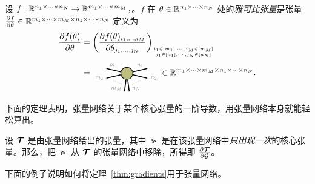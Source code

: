 \begin{definition}
 设 $f:\mathbb{R}^{n_1\times\dots\times n_N}\to\mathbb{R}^{m_1\times\dots\times m_M}$，。$f$ 在 $\theta\in\mathbb{R}^{n_1\times\dots\times n_N}$ 处的\emph{雅可比张量}是张量 $\frac{\partial f}{\partial\theta}\in\mathbb{R}^{m_1\times\dots\times m_M\times n_1\times\dots\times n_N}$
 定义为
\begin{align*}
   \frac{\partial f(\theta)}{\partial\theta} 
   &= 
   \left(\frac{\partial f(\theta)_{i_1,\dots,i_M}}{\partial\theta_{j_1,\dots,j_N}}\right)_{i_1\in[m_1],\cdots,i_M\in[m_M]\atop j_1\in[n_1],\cdots,j_N
\in[n_N]}\\
&=
\begin{tikzpicture}[baseline=-0.5ex]
    \tikzset{tensor/.style = {minimum size = 0.5cm,shape = circle,thick,draw=black,inner sep = 0pt}, edge/.style = {thick,line width=.4mm},every loop/.style={}}
    \def\x{6}
    \node[tensor,fill=green!50!red!50!white] (T) at (\x,0) {};
    \draw[edge] (T) -- (\x-0.85,0.2)node [midway, above]{\scalebox{0.7}{\dimcolor{$m_1$}}};
    \draw[edge] (T) -- (\x-0.85,-0.2)node [left]{\scalebox{0.7}{\dimcolor{$m_2$}}};
    \draw[edge] (T) -- (\x-0.1,-0.75)node [near end, left]{\scalebox{0.7}{\dimcolor{$m_M$}}};
    \draw[dotted] (\x-0.55,-0.3) -- (\x-0.2,-0.45);
    \draw[edge] (T) -- (\x+0.85,0.2)node [midway, above]{\scalebox{0.7}{\dimcolor{$n_1$}}};
    \draw[edge] (T) -- (\x+0.85,-0.2)node [right]{\scalebox{0.7}{\dimcolor{$n_2$}}};
    \draw[edge] (T) -- (\x+0.1,-0.75)node [near end, right]{\scalebox{0.7}{\dimcolor{$n_N$}}};
    \draw[dotted] (\x+0.55,-0.3) -- (\x+0.2,-0.45);
    \end{tikzpicture}\in\RR^{m_1\times\cdots\times m_M\times n_1\times\cdots\times n_N}. 
\end{align*}
\end{definition}




下面的定理表明，张量网络关于某个核心张量的一阶导数，用张量网络本身就能轻松算出。

\begin{theorem}\label{thm:gradients}
    设 $\bm{\mathcal{T}}$ 是由张量网络给出的张量，其中 $\Gt$ 是在该张量网络中\emph{只出现一次}的核心张量。那么，把 $\Gt$ 从 $\bm{\mathcal{T}}$ 的张量网络中移除，所得即 $\frac{\partial \bm{\mathcal{T}}}{\partial \bm{\mathcal{G}}}$。 
\end{theorem}
下面的例子说明如何将定理~\ref{thm:gradients}用于张量网络。
